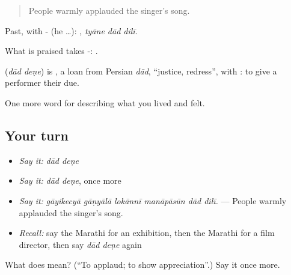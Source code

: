 \begin{quote}
People warmly applauded the singer's song.
\end{quote}

Past, with - (he …):   , \emph{tyāne dād dilī}.

What is praised takes -:   .

\begin{cousinweb}
\textbf{ } (\emph{dād deṇe}) is , a loan from Persian \emph{dād}, \textquotedblleft{}justice, redress\textquotedblright{}, with : to give a performer their due.
\end{cousinweb}

\begin{grammarlens}[title={What you've built}]
One more word for describing what you lived and felt.
\end{grammarlens}

\subsection*{Your turn}
\begin{itemize}
\raggedright
  \item \emph{Say it:} \emph{dād deṇe}
  \item \emph{Say it:} \emph{dād deṇe}, once more
  \item \emph{Say it:} \emph{gāyikecyā gāṇyālā lokānnī manāpāsūn dād dilī.} — People warmly applauded the singer's song.
  \item \emph{Recall:} say the Marathi for an exhibition, then the Marathi for a film director, then say \emph{dād deṇe} again
\end{itemize}

\begin{tcolorbox}[breakable,colback=teal!4,colframe=teal!35!black,title={Before you move on}]
What does   mean? (\textquotedblleft{}To applaud; to show appreciation\textquotedblright{}.) Say it once more.
\end{tcolorbox}
